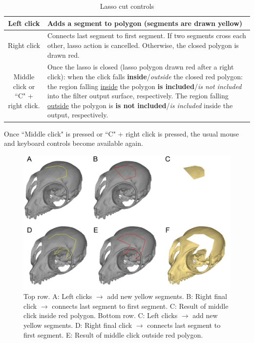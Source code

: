 \begin{table}
\begin{tabularx}{\linewidth}{ | c | X | }
\hline			
Left click & Adds a segment to polygon (segments are drawn yellow) \\ \hline			

Right click & Connects last segment to first segment. If two segments cross each other, lasso action is cancelled. Otherwise, the closed polygon is drawn red.\\ \hline			

Middle click or ``C" + right click. & Once the lasso is closed (lasso polygon drawn red
after a right click):\newline
when the click falls \textbf{inside}/\textit{outside} the closed red polygon: the region falling \underline{inside} the polygon \textbf{is included}/\textit{is not included} into the filter output surface, respectively. The region falling \underline{outside} the polygon is \textbf{is not included}/\textit{is included} inside the output, respectively.

\\ \hline	
			

\end{tabularx}
\caption{Lasso cut controls}	
\label{lasso_cut_controls}	
\end{table}
Once ``Middle click" is pressed or ``C" + right click is pressed, the usual mouse and keyboard controls become available again.\\

\begin{figure}
  \centering
  \includegraphics[scale=0.25]{images/Edit_selected_objects/04_Lasso_cut.pdf} 
	\caption{Top row. A: Left clicks $\rightarrow$ add new yellow segments. B: Right final click $\rightarrow$ connects last segment to first segment. C: Result of middle click inside red polygon. Bottom row. C: Left clicks $\rightarrow$ add new yellow segments. D: Right final click $\rightarrow$ connects last segment to first segment. E: Result of middle click outside red polygon. }
\label{lasso_cut}
 
\end{figure}




